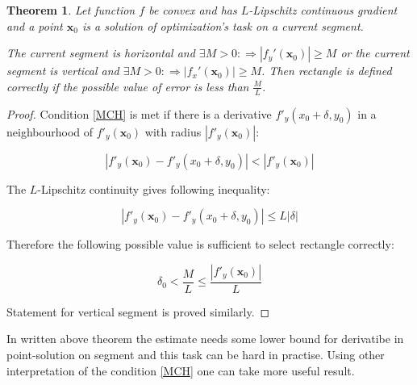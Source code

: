 \documentclass[12pt]{article}
\newtheorem{theorem}{Theorem}[section]
\begin{document}
\begin{theorem}
Let function $f$ be convex and has $L$-Lipschitz continuous gradient and a point $\textbf{x}_0$ is a solution of optimization's  task on a current segment. 

The current segment is horizontal and $\exists M>0  : \Rightarrow|f_y'(\textbf{x}_0)| \geq M$ or the current segment is vertical and $\exists M>0  : \Rightarrow|f_x'(\textbf{x}_0)| \geq M$. Then rectangle is defined correctly if the possible value of error is less than $\frac{M}{L}$.
\end{theorem}
\begin{proof}
Condition \eqref{MCH} is met if there is a derivative $f'_y(x_0+\delta, y_0)$ in a neighbourhood of 
$f'_y(\textbf{x}_0)$ with radius $\left|f'_y(\textbf{x}_0)\right|$:

$$\left|f'_y(\textbf{x}_0) - f'_y(x_0+\delta, y_0)\right|<\left|f'_y(\textbf{x}_0)\right|$$

The $L$-Lipschitz continuity gives following inequality:

$$\left|f'_y(\textbf{x}_0) - f'_y(x_0+\delta, y_0)\right| \leq L|\delta|$$

Therefore the following possible value is sufficient to select rectangle correctly:

$$\delta_0 < \frac{M}{L} \leq \frac{\left|f'_y(\textbf{x}_0)\right|}{L}$$

Statement for vertical segment is proved similarly.
\end{proof}

In written above theorem the estimate needs some lower bound for derivatibe in point-solution on segment and this task can be hard in practise. Using other interpretation of the condition \eqref{MCH} one can take more useful result.
\end{document}
